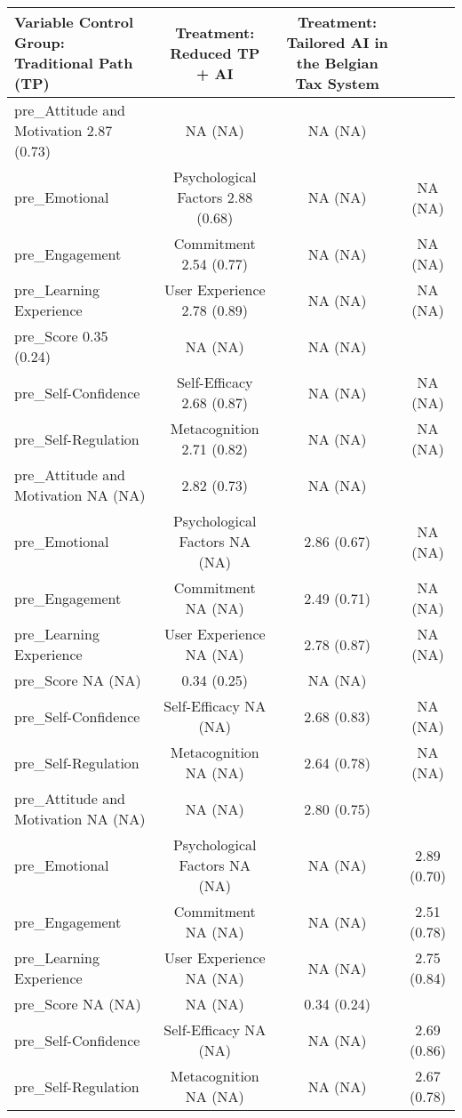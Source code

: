 \begin{tabular}{l
ccc
}
\hline
Variable Control Group: Traditional Path (TP) & Treatment: Reduced TP + AI & Treatment: Tailored AI in the Belgian Tax System \\
\hline
pre_Attitude and Motivation 2.87 (0.73) & NA (NA) & NA (NA) \\
pre_Emotional & Psychological Factors 2.88 (0.68) & NA (NA) & NA (NA) \\
pre_Engagement & Commitment 2.54 (0.77) & NA (NA) & NA (NA) \\
pre_Learning Experience & User Experience 2.78 (0.89) & NA (NA) & NA (NA) \\
pre_Score 0.35 (0.24) & NA (NA) & NA (NA) \\
pre_Self-Confidence & Self-Efficacy 2.68 (0.87) & NA (NA) & NA (NA) \\
pre_Self-Regulation & Metacognition 2.71 (0.82) & NA (NA) & NA (NA) \\
pre_Attitude and Motivation NA (NA) & 2.82 (0.73) & NA (NA) \\
pre_Emotional & Psychological Factors NA (NA) & 2.86 (0.67) & NA (NA) \\
pre_Engagement & Commitment NA (NA) & 2.49 (0.71) & NA (NA) \\
pre_Learning Experience & User Experience NA (NA) & 2.78 (0.87) & NA (NA) \\
pre_Score NA (NA) & 0.34 (0.25) & NA (NA) \\
pre_Self-Confidence & Self-Efficacy NA (NA) & 2.68 (0.83) & NA (NA) \\
pre_Self-Regulation & Metacognition NA (NA) & 2.64 (0.78) & NA (NA) \\
pre_Attitude and Motivation NA (NA) & NA (NA) & 2.80 (0.75) \\
pre_Emotional & Psychological Factors NA (NA) & NA (NA) & 2.89 (0.70) \\
pre_Engagement & Commitment NA (NA) & NA (NA) & 2.51 (0.78) \\
pre_Learning Experience & User Experience NA (NA) & NA (NA) & 2.75 (0.84) \\
pre_Score NA (NA) & NA (NA) & 0.34 (0.24) \\
pre_Self-Confidence & Self-Efficacy NA (NA) & NA (NA) & 2.69 (0.86) \\
pre_Self-Regulation & Metacognition NA (NA) & NA (NA) & 2.67 (0.78) \\
\hline
\end{tabular}

